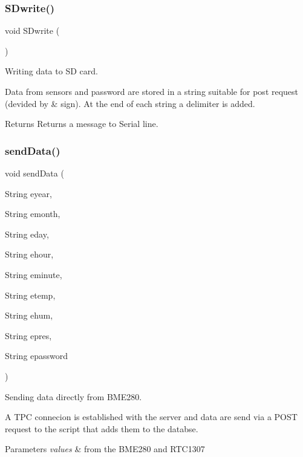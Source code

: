 \subsubsection{\texorpdfstring{S\+Dwrite()}{SDwrite()}}
{\footnotesize\ttfamily void S\+Dwrite (\begin{DoxyParamCaption}{ }\end{DoxyParamCaption})}



Writing data to SD card. 

Data from sensors and password are stored in a string suitable for post request (devided by \& sign). At the end of each string a delimiter is added. \begin{DoxyReturn}{Returns}
Returns a message to Serial line. 
\end{DoxyReturn}
\mbox{\label{_w_s_8ino_aa9f1e5f04588dc7c432816e2faac1c2a}} 
\subsubsection{\texorpdfstring{send\+Data()}{sendData()}}
{\footnotesize\ttfamily void send\+Data (\begin{DoxyParamCaption}\item[{String}]{eyear,  }\item[{String}]{emonth,  }\item[{String}]{eday,  }\item[{String}]{ehour,  }\item[{String}]{eminute,  }\item[{String}]{etemp,  }\item[{String}]{ehum,  }\item[{String}]{epres,  }\item[{String}]{epassword }\end{DoxyParamCaption})}



Sending data directly from B\+M\+E280. 

A T\+PC connecion is established with the server and data are send via a P\+O\+ST request to the script that adds them to the databse. 
\begin{DoxyParams}{Parameters}
{\em values} & from the B\+M\+E280 and R\+T\+C1307 \\
\hline
\end{DoxyParams}
\mbox{\label{_w_s_8ino_acca4eb89d9cb2ffb1d5d9fa19d429f9c}} 
